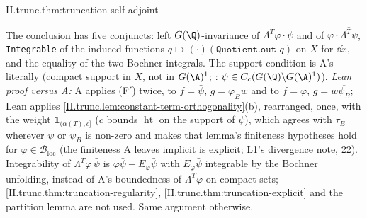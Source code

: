 \begin{tfformal}{II.trunc.thm:truncation-self-adjoint}
\begin{tffidelity}
The conclusion has five conjuncts: left $G(\Q)$-invariance of $\Lambda^T\varphi\cdot\bar\psi$ and of $\varphi\cdot\overline{\Lambda^T\psi}$, \texttt{Integrable} of the induced functions $q\mapsto(\cdot)(\texttt{Quotient.out }q)$ on $X$ for $\dd\dot x$, and the equality of the two Bochner integrals. The support condition is A's literally (compact support in $X$, not in $G(\A)^1$; \cite[Prop.~13.1 (c)]{AIntro}: $\psi\in C_c(G(\Q)\backslash G(\A)^1)$). \emph{Lean proof versus A:} A applies (F$'$) twice, to $f=\bar\psi$, $g=\varphi_Bw$ and to $f=\varphi$, $g=w\overline{\psi_B}$; Lean applies \cref{II.trunc.lem:constant-term-orthogonality}(b), rearranged, once, with the weight $\mathbf 1_{(\alpha(T),c]}$ ($c$ bounds $\operatorname{ht}$ on the support of $\psi$), which agrees with $\tau_B$ wherever $\psi$ or $\psi_B$ is non-zero and makes that lemma's finiteness hypotheses hold for $\varphi\in\mathcal B_{\mathrm{loc}}$ (the finiteness A leaves implicit is explicit; L1's divergence note, 22). Integrability of $\Lambda^T\varphi\,\bar\psi$ is $\varphi\bar\psi-E_\varphi\bar\psi$ with $E_\varphi\bar\psi$ integrable by the Bochner unfolding, instead of A's boundedness of $\Lambda^T\varphi$ on compact sets; \cref{II.trunc.thm:truncation-regularity}, \cref{II.trunc.thm:truncation-explicit} and the partition lemma are not used. Same argument otherwise.
\end{tffidelity}
\end{tfformal}
